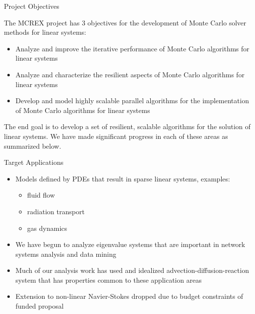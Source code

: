 \documentclass{beamer}
\begin{document}
\begin{frame}{Project Objectives}

  The MCREX project has 3 objectives for the development of Monte Carlo solver
  methods for linear systems:
  \begin{itemize}
  \item Analyze and improve the iterative performance of Monte Carlo
    algorithms for linear systems
  \item Analyze and characterize the resilient aspects of Monte Carlo
    algorithms for linear systems
  \item Develop and model highly scalable parallel algorithms for the
    implementation of Monte Carlo algorithms for linear systems
 \end{itemize}
 The end goal is to develop a set of resilient, scalable algorithms for the
 solution of linear systems.  We have made significant progress in each of
 these areas as summarized below.

\end{frame}


\begin{frame}{Target Applications}

  \begin{itemize}

  \item Models defined by PDEs that result in sparse linear systems, examples:
    \begin{itemize}
    \item fluid flow
    \item radiation transport
    \item gas dynamics
    \end{itemize}

  \item We have begun to analyze eigenvalue systems that are important in
    network systems analysis and data mining

  \item Much of our analysis work has used and idealized
    advection-diffusion-reaction system that has properties common to these
    application areas

  \item Extension to non-linear Navier-Stokes dropped due to budget
    constraints of funded proposal
  \end{itemize}

\end{frame}
\end{document}
